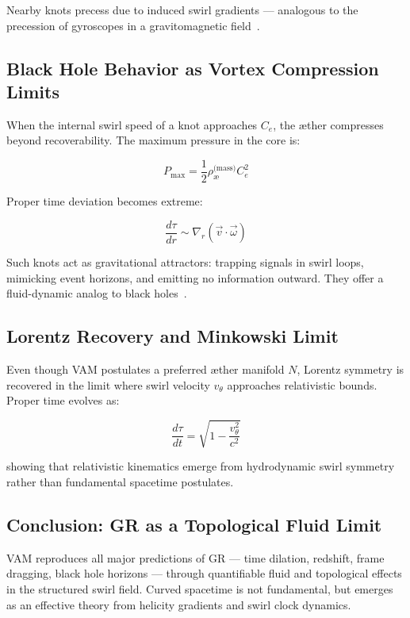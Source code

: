 \documentclass[12pt]{article}
\begin{document}
    Nearby knots precess due to induced swirl gradients — analogous to the precession of gyroscopes in a gravitomagnetic field~\cite{moffatt1969degree}.

    \subsection{Black Hole Behavior as Vortex Compression Limits}
    When the internal swirl speed of a knot approaches \( C_e \), the æther compresses beyond recoverability. The maximum pressure in the core is:

    \begin{equation}
        P_{\text{max}} = \frac{1}{2} \rho_{\text{\ae}}^{\text{(mass)}} C_e^2
    \end{equation}

    Proper time deviation becomes extreme:

    \begin{equation}
        \frac{d\tau}{dr} \sim \nabla_r (\vec{v} \cdot \vec{\omega})
    \end{equation}

    Such knots act as gravitational attractors: trapping signals in swirl loops, mimicking event horizons, and emitting no information outward. They offer a fluid-dynamic analog to black holes~\cite{volovik2003universe}.

    \subsection{Lorentz Recovery and Minkowski Limit}
    Even though VAM postulates a preferred æther manifold \( N \), Lorentz symmetry is recovered in the limit where swirl velocity \( v_\theta \) approaches relativistic bounds. Proper time evolves as:

    \begin{equation}
        \frac{d\tau}{dt} = \sqrt{1 - \frac{v_\theta^2}{c^2}}
    \end{equation}

    showing that relativistic kinematics emerge from hydrodynamic swirl symmetry rather than fundamental spacetime postulates.

    \subsection{Conclusion: GR as a Topological Fluid Limit}
    VAM reproduces all major predictions of GR — time dilation, redshift, frame dragging, black hole horizons — through quantifiable fluid and topological effects in the structured swirl field. Curved spacetime is not fundamental, but emerges as an effective theory from helicity gradients and swirl clock dynamics.
\end{document}
